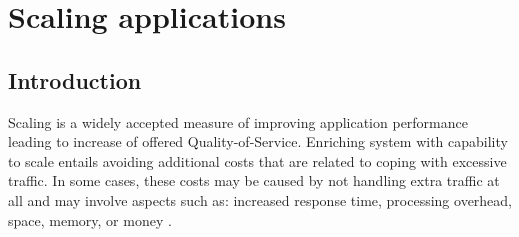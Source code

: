 \newpage
\section{Scaling applications}

\subsection{Introduction}

Scaling is a widely accepted measure of improving application performance leading to increase of offered Quality-of-Service. Enriching system with capability to scale entails avoiding additional costs that are related to coping with excessive traffic. In some cases, these costs may be caused by not handling extra traffic at all and may involve aspects such as: increased response time, processing overhead, space, memory, or money \cite{Bo00}. 

